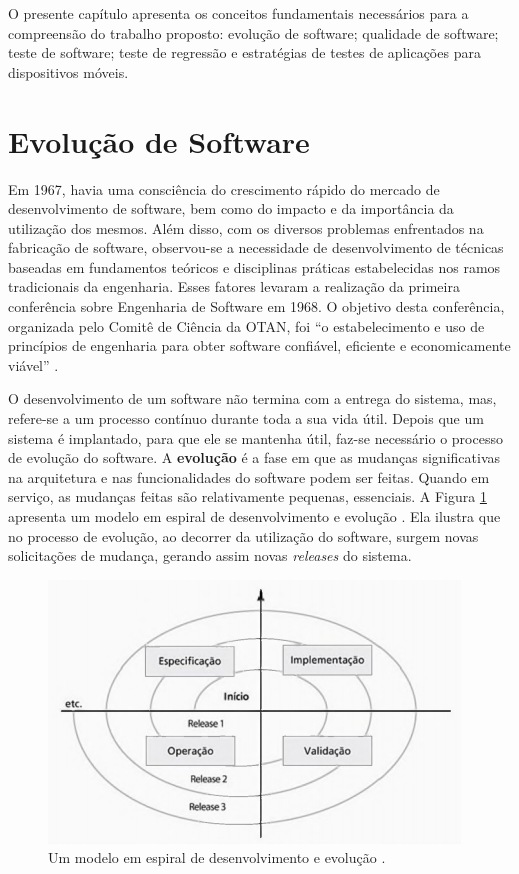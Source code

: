\acresetall 
O presente capítulo apresenta os conceitos fundamentais necessários para a compreensão do trabalho proposto: evolução de software; qualidade de software; teste de software; teste de regressão e estratégias de testes de aplicações para dispositivos móveis.


\section{Evolução de Software}\label{sec:evolucaodesoftware}

Em 1967, havia uma consciência do crescimento rápido do mercado de desenvolvimento de software, bem como do impacto e da importância da utilização dos mesmos. Além disso, com os diversos problemas enfrentados na fabricação de software, observou-se a necessidade de desenvolvimento de técnicas baseadas em fundamentos teóricos e disciplinas práticas estabelecidas nos ramos tradicionais da engenharia. Esses fatores levaram a realização da primeira conferência sobre Engenharia de Software em 1968. O objetivo desta conferência, organizada pelo Comitê de Ciência da \ac{OTAN}, foi “o estabelecimento e uso de princípios de engenharia para obter software confiável, eficiente e economicamente viável” \cite{DBLP:series/springer/Mens08}.

O desenvolvimento de um software não termina com a entrega do sistema, mas, refere-se a um processo contínuo durante toda a sua vida útil. Depois que um sistema é implantado, para que ele se mantenha útil, faz-se necessário o processo de evolução do software. A \textbf{evolução} é a fase em que as mudanças significativas na arquitetura e nas funcionalidades do software podem ser feitas. Quando em serviço, as mudanças feitas são relativamente pequenas, essenciais. A Figura \ref{figure:modeloevolucao} apresenta um modelo em espiral de desenvolvimento e evolução \cite{sommerville2011engenharia}. Ela ilustra que no processo de evolução, ao decorrer da utilização do software, surgem novas solicitações de mudança, gerando assim novas \textit{releases} do sistema.

\begin{figure}[!htb]
\centering
\includegraphics[width=.55\textwidth]{images/modeloevolucao.png}
\caption{Um modelo em espiral de desenvolvimento e evolução \cite{sommerville2011engenharia}.}
\label{figure:modeloevolucao}
\end{figure}

